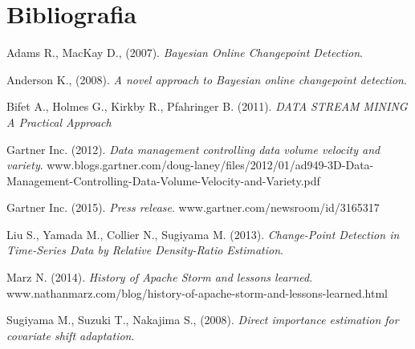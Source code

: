 \chapter*{Bibliografia}

\begin{references}

\item
Adams R., MacKay D., (2007).
\textit{Bayesian Online Changepoint Detection}.

\item
Anderson K., (2008).
\textit{A novel approach to Bayesian online changepoint detection}.

\item
Bifet A., Holmes G., Kirkby R., Pfahringer B. (2011).
\textit{DATA STREAM MINING A Practical Approach}

\item
Gartner Inc. (2012).
\textit{Data management controlling data volume velocity and variety}.
www.blogs.gartner.com/doug-laney/files/2012/01/ad949-3D-Data-Management-Controlling-Data-Volume-Velocity-and-Variety.pdf

\item
Gartner Inc. (2015).
\textit{Press release}.
www.gartner.com/newsroom/id/3165317

\item
Liu S., Yamada M., Collier N., Sugiyama M. (2013).
\textit{Change-Point Detection in Time-Series Data by Relative Density-Ratio Estimation}.

\item
Marz N. (2014).
\textit{History of Apache Storm and lessons learned}.
www.nathanmarz.com/blog/history-of-apache-storm-and-lessons-learned.html

\item
Sugiyama M., Suzuki T., Nakajima S., (2008).
\textit{Direct importance estimation for covariate shift adaptation}.

\end{references}
